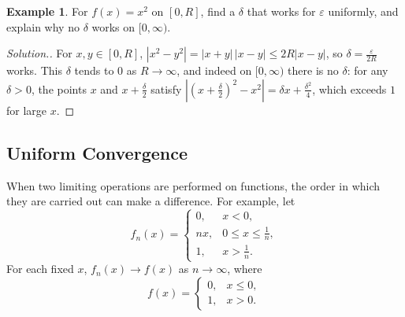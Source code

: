 \documentclass[11pt,a4paper]{article}
\numberwithin{equation}{section}
\theoremstyle{definition}
\newtheorem{exa}[thm]{Example}
\newenvironment{solution}
  {\renewcommand{\qedsymbol}{}\begin{proof}[\textit{Solution}.]}
  {\end{proof}}
\begin{document}
\begin{exa}
For $f(x) = x^2$ on $[0,R]$, find a $\delta$ that works for $\varepsilon$ uniformly, and explain why no $\delta$ works on $[0,\infty)$.
\end{exa}

\begin{solution}
For $x,y\in[0,R]$, $|x^2-y^2| = |x+y|\,|x-y|\leq 2R|x-y|$, so $\delta = \frac{\varepsilon}{2R}$ works. This $\delta$ tends to $0$ as $R\longrightarrow\infty$, and indeed on $[0,\infty)$ there is no $\delta$: for any $\delta>0$, the points $x$ and $x+\frac{\delta}{2}$ satisfy $\left|(x+\frac{\delta}{2})^2 - x^2\right| = \delta x + \frac{\delta^2}{4}$, which exceeds $1$ for large $x$.
\end{solution}


\subsection{Uniform Convergence}

When two limiting operations are performed on functions, the order in which they are carried out can make a difference. For example, let
\[
f_n(x) = \begin{cases}
0, & x < 0,\\
nx, & 0\leq x \leq \frac{1}{n},\\
1, & x> \frac{1}{n}.
\end{cases}
\]
For each fixed $x$, $f_n(x)\longrightarrow f(x)$ as $n\longrightarrow \infty$, where
$$f(x) = \begin{cases}
0, & x\leq 0,\\
1, & x>0.
\end{cases}$$

\begin{figure}[H]
\centering
{}
\end{figure}

\begin{figure}[H]
\centering
{}
\end{figure}
\end{document}
